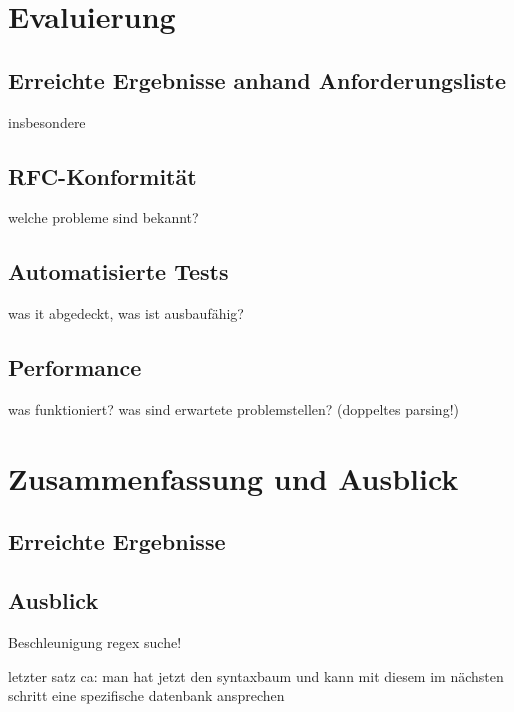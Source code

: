 \documentclass[oneside]{ausarbeitung}
\begin{document}
	
	\chapter{Evaluierung}
	\label{chapt_evaluierung}
	
	\section{Erreichte Ergebnisse anhand Anforderungsliste}
	\label{sect_erreichte_ergebnisse_anforderung}
	
	insbesondere
	\section{RFC-Konformität}
	\label{sect_rfc_konformitaet}
	
	welche probleme sind bekannt?
	
	\section{Automatisierte Tests}
	\label{sect_automatisierte_tests}
	
	was it abgedeckt, was ist ausbaufähig?
	
	
	\section{Performance}
	\label{sect_performance}
	
	was funktioniert?
	was sind erwartete problemstellen? (doppeltes parsing!)


	
	
	
	
	\chapter{Zusammenfassung und Ausblick}
	\label{chapt_zusammenfassung}
	
	\section{Erreichte Ergebnisse}
	\label{sect_erreichte_ergebnisse}
	
	\section{Ausblick}
	\label{sect_ausblick}
	
	Beschleunigung regex suche!
	
	letzter satz ca:
	man hat jetzt den syntaxbaum und kann mit diesem im nächsten schritt eine spezifische datenbank ansprechen
	
\end{document}
